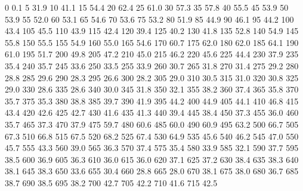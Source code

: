 0 0.1
5 31.9
10 41.1
15 54.4
20 62.4
25 61.0
30 57.3
35 57.8
40 55.5
45 53.9
50 53.9
55 52.0
60 53.1
65 54.6
70 53.6
75 53.2
80 51.9
85 44.9
90 46.1
95 44.2
100 43.4
105 45.5
110 43.9
115 42.4
120 39.4
125 40.2
130 41.8
135 52.8
140 54.9
145 55.8
150 55.5
155 54.9
160 55.0
165 54.6
170 60.7
175 62.0
180 62.0
185 64.1
190 61.0
195 51.7
200 49.8
205 47.2
210 45.0
215 46.2
220 45.6
225 44.4
230 37.9
235 35.4
240 35.7
245 33.6
250 33.5
255 33.9
260 30.7
265 31.8
270 31.4
275 29.2
280 28.8
285 29.6
290 28.3
295 26.6
300 28.2
305 29.0
310 30.5
315 31.0
320 30.8
325 29.0
330 28.6
335 28.6
340 30.0
345 31.8
350 32.1
355 38.2
360 37.4
365 35.8
370 35.7
375 35.3
380 38.8
385 39.7
390 41.9
395 44.2
400 44.9
405 44.1
410 46.8
415 43.4
420 42.6
425 42.7
430 41.6
435 41.3
440 39.4
445 38.4
450 37.3
455 36.0
460 35.7
465 37.3
470 37.9
475 59.7
480 60.6
485 60.0
490 60.9
495 63.2
500 66.7
505 67.3
510 66.8
515 67.5
520 68.2
525 67.4
530 64.9
535 45.6
540 46.2
545 47.0
550 45.7
555 43.3
560 39.0
565 36.3
570 37.4
575 35.4
580 33.9
585 32.1
590 37.7
595 38.5
600 36.9
605 36.3
610 36.0
615 36.0
620 37.1
625 37.2
630 38.4
635 38.3
640 38.1
645 38.3
650 33.6
655 30.4
660 28.8
665 28.0
670 38.1
675 38.0
680 36.7
685 38.7
690 38.5
695 38.2
700 42.7
705 42.2
710 41.6
715 42.5
